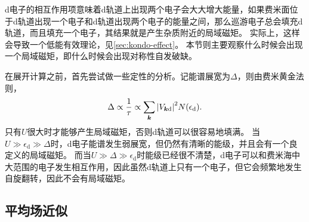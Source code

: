 d电子的相互作用项意味着d轨道上出现两个电子会大大增大能量，如果费米面位于d轨道出现一个电子和d轨道出现两个电子的能量之间，那么巡游电子总会填充d轨道，而且填充一个电子，其结果就是产生杂质附近的局域磁矩。
实际上，这样会导致一个低能有效理论，见\autoref{sec:kondo-effect}。
本节则主要观察什么时候会出现一个局域磁矩，即什么时候会出现对称性自发破缺。

在展开计算之前，首先尝试做一些定性的分析。记能谱展宽为$\Delta$，则由费米黄金法则，
\[
    \Delta \propto \frac{1}{\tau} \propto \sum_{\vb*{k}} \abs{V_{\vb*{k} \text{d}}}^2 N(\epsilon_\text{d}).
\]
只有$U$很大时才能够产生局域磁矩，否则d轨道可以很容易地填满。
当$U \gg \epsilon_\text{d} \gg \Delta$时，d电子能谱发生弱展宽，但仍然有清晰的能级，并且会有一个良定义的局域磁矩。
而当$U \gg \Delta \gg \epsilon_\text{d}$时能级已经很不清楚，d电子可以和费米海中大范围的电子发生相互作用，因此虽然d轨道上只有一个电子，但它会频繁地发生自旋翻转，因此不会有局域磁矩。

\subsection{平均场近似}

